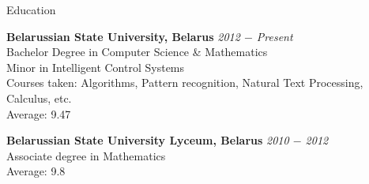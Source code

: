 \documentclass{resume} %
\begin{document}

\begin{rSection}{Education}

{\bf Belarussian State University, Belarus} \hfill {\em 2012 $-$ Present} \\ 
Bachelor Degree in Computer Science \& Mathematics \\
Minor in Intelligent Control Systems \smallskip \\
Courses taken: Algorithms, Pattern recognition, Natural Text Processing, Calculus, etc. \smallskip \\
Average: 9.47

{\bf Belarussian State University Lyceum, Belarus} \hfill {\em 2010 $-$ 2012} \\ 
Associate degree in Mathematics \\
Average: 9.8

\end{rSection}

\end{document}
